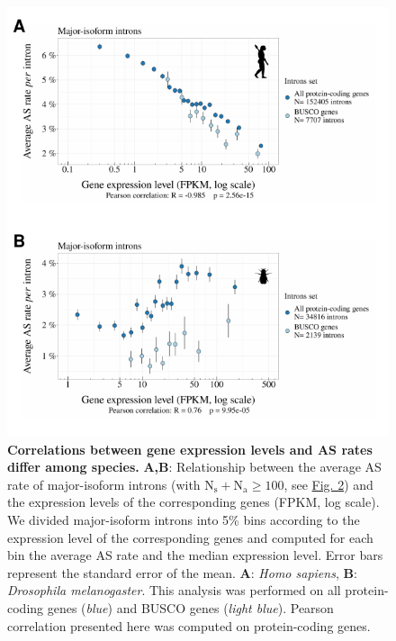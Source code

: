 \begin{figure}[t]   
    \begin{center}                                                                       
        \includegraphics[width=\textwidth] {Figure7_supp.pdf}
    \end{center}                                                                       
    \caption[Correlations between gene expression levels and AS rates differ among species]{\textbf{Correlations between gene expression levels and AS rates differ among species.} \textbf{A,B}: Relationship between the average AS rate of major-isoform introns (with $\mathrm{N_s+N_a}\geq100$, see \hyperref[fig:AS2]{Fig. 2}) and the expression levels of the corresponding genes (FPKM, log scale). We divided major-isoform introns into 5\% bins according to the expression level of the corresponding genes and computed for each bin the average AS rate and the median expression level. Error bars represent the standard error of the mean. \textbf{A}: \textit{Homo sapiens}, \textbf{B}: \textit{Drosophila melanogaster}. This analysis was performed on all protein-coding genes (\textit{blue}) and BUSCO genes (\textit{light blue}). Pearson correlation presented here was computed on protein-coding genes.}
    \label{supp_fig:AS7}
\end{figure}


